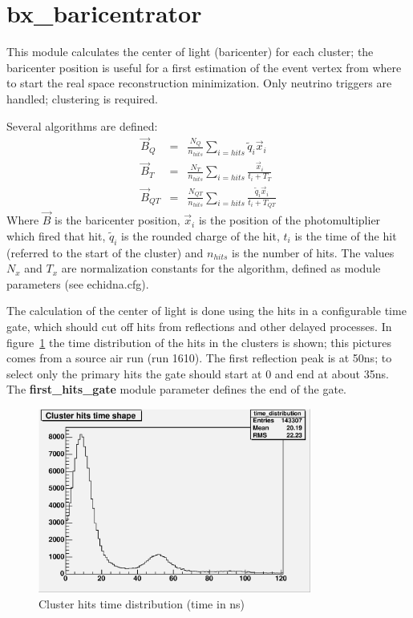 \section{bx\_baricentrator}
\label{sec:bx_baricentrator}

This module calculates the center of light (baricenter) for each cluster; the baricenter
position is useful for a first estimation of the event vertex from where to start the real
space reconstruction minimization. Only neutrino triggers are handled; clustering is required.

Several algorithms are defined:
\begin{eqnarray}
\vec{B}_Q & = & \frac{N_Q}{n_{hits}} \sum_{i = hits} \tilde{q}_i \vec{x}_i\\
\vec{B}_T & = & \frac{N_T}{n_{hits}} \sum_{i = hits} \frac {\vec{x}_i}{t_i + T_T}\\
\vec{B}_{QT} & = & \frac{N_{QT}}{n_{hits}} \sum_{i = hits} \frac {\tilde{q}_i \vec{x}_i}{t_i + T_{QT}}
\end{eqnarray}
Where $\vec{B}$ is the baricenter position, $\vec{x}_i$ is the position of the photomultiplier which
fired that hit, $\tilde{q}_i$ is the rounded charge of the hit, $t_i$ is the time of the hit (referred to the start
of the cluster) and $n_{hits}$ is the number of hits. The values $N_x$ and $T_x$ are normalization constants for the algorithm, defined as 
module parameters (see echidna.cfg).

The calculation of the center of light is done using the hits in a configurable time gate, 
which should cut off hits from reflections and other delayed processes.
In figure~\ref{fig:cluster_time_distrib} the time distribution of the hits in the clusters is shown;
this pictures comes from a source air run (run 1610). The first reflection peak is at 50ns; to select only
the primary hits the gate should start at 0 and end at about 35ns. The {\bf first\_hits\_gate}
module parameter defines the end of the gate.

\begin{figure}[h]
\begin{center}
\includegraphics[width=0.8\textwidth]{pictures/cluster_time_distrib}
\caption{Cluster hits time distribution (time in ns)}
\label{fig:cluster_time_distrib}
\end{center}
\end{figure}

